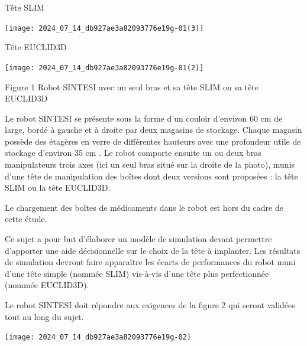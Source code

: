 \documentclass[10pt]{article}
\begin{document}
Tête SLIM

\begin{center}
\texttt{[image: 2024\_07\_14\_db927ae3a82093776e19g-01(3)]}
\end{center}

Tête EUCLID3D

\begin{center}
\texttt{[image: 2024\_07\_14\_db927ae3a82093776e19g-01(2)]}
\end{center}

Figure 1 Robot SINTESI avec un seul bras et sa tête SLIM ou sa tête EUCLID3D

Le robot SINTESI se présente sous la forme d'un couloir d'environ 60 cm de large, bordé à gauche et à droite par deux magasins de stockage. Chaque magasin possède des étagères en verre de différentes hauteurs avec une profondeur utile de stockage d'environ 35 cm . Le robot comporte ensuite un ou deux bras manipulateurs trois axes (ici un seul bras situé sur la droite de la photo), munis d'une tête de manipulation des boîtes dont deux versions sont proposées : la tête SLIM ou la tête EUCLID3D.

Le chargement des boîtes de médicaments dans le robot est hors du cadre de cette étude.

Ce sujet a pour but d'élaborer un modèle de simulation devant permettre d'apporter une aide décisionnelle sur le choix de la tête à implanter. Les résultats de simulation devront faire apparaître les écarts de performances du robot muni d'une tête simple (nommée SLIM) vis-à-vis d'une tête plus perfectionnée (nommée EUCLID3D).

Le robot SINTESI doit répondre aux exigences de la figure 2 qui seront validées tout au long du sujet.

\begin{center}
\texttt{[image: 2024\_07\_14\_db927ae3a82093776e19g-02]}
\end{center}
\end{document}
